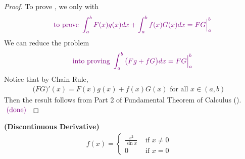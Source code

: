 \documentclass{report}
\begin{document}
\begin{proof}
To prove , we only with 
\begin{align*}
\textcolor{violet}{\text{ to prove }\int_a^b F(x)g(x)dx+\int_a^b f(x)G(x)dx=FG\Big|_a^b}
\end{align*}
We can reduce the problem 
\begin{align*}
\textcolor{violet}{\text{ into proving }\int_a^b \big( Fg+fG \big) dx=FG\Big|_a^b}
\end{align*}
Notice that by Chain Rule,  
\begin{align*}
\big(FG \big)'(x)=F(x)g(x)+f(x)G(x)\text{ for all $x \in (a,b)$ }
\end{align*}
Then the result follows from Part 2 of Fundamental Theorem of Calculus (). $\textcolor{violet}{\text{ (done) }}$
\end{proof}
\begin{Example}{\textbf{(Discontinuous Derivative)}}{}
\begin{align*}
f(x)=\begin{cases}
  \frac{x^2}{\sin x}& \text{ if $x\neq 0$ }\\
  0& \text{ if $x=0$ }
\end{cases}
\end{align*}
\end{Example}
\end{document}
